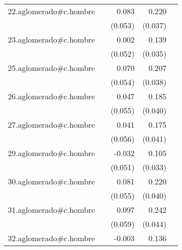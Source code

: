 {\begin{longtable}{l*{4}{D{.}{.}{-1}}}
\addlinespace
22.aglomerado#c.hombre&                     &       0.083         &       0.220\sym{***}&                     \\
            &                     &     (0.053)         &     (0.037)         &                     \\
\addlinespace
23.aglomerado#c.hombre&                     &       0.002         &       0.139\sym{***}&                     \\
            &                     &     (0.052)         &     (0.035)         &                     \\
\addlinespace
25.aglomerado#c.hombre&                     &       0.070         &       0.207\sym{***}&                     \\
            &                     &     (0.054)         &     (0.038)         &                     \\
\addlinespace
26.aglomerado#c.hombre&                     &       0.047         &       0.185\sym{***}&                     \\
            &                     &     (0.055)         &     (0.040)         &                     \\
\addlinespace
27.aglomerado#c.hombre&                     &       0.041         &       0.175\sym{***}&                     \\
            &                     &     (0.056)         &     (0.041)         &                     \\
\addlinespace
29.aglomerado#c.hombre&                     &      -0.032         &       0.105\sym{**} &                     \\
            &                     &     (0.051)         &     (0.033)         &                     \\
\addlinespace
30.aglomerado#c.hombre&                     &       0.081         &       0.220\sym{***}&                     \\
            &                     &     (0.055)         &     (0.040)         &                     \\
\addlinespace
31.aglomerado#c.hombre&                     &       0.097         &       0.242\sym{***}&                     \\
            &                     &     (0.059)         &     (0.044)         &                     \\
\addlinespace
32.aglomerado#c.hombre&                     &      -0.003         &       0.136\sym{***}&                     \\

\end{longtable}}
